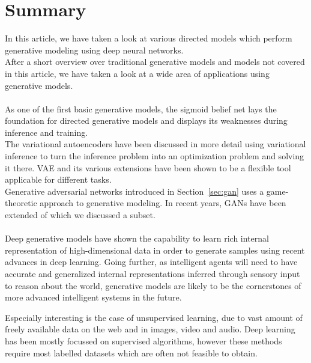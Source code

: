 \section{Summary}
\label{sec:summary}

In this article, we have taken a look at various directed models which perform generative modeling using deep neural networks.\\
After a short overview over traditional generative models and models not covered in this article, we have taken a look at a wide area of applications using generative models.\\\\
%
As one of the first basic generative models, the sigmoid belief net lays the foundation for directed generative models and displays its weaknesses during inference and training.\\
The variational autoencoders have been discussed in more detail using variational inference to turn the inference problem into an optimization problem and solving it there.
VAE and its various extensions have been shown to be a flexible tool applicable for different tasks.\\
%
Generative adversarial networks introduced in Section~\ref{sec:gan} uses a game-theoretic approach to generative modeling. In recent years, GANs have been extended of which we discussed a subset.\\\\
%
Deep generative models have shown the capability to learn rich internal representation of high-dimensional data in order to generate samples using recent advances in deep learning.
Going further, as intelligent agents will need to have accurate and generalized internal representations inferred through sensory input to reason about the world, generative models are likely to be the cornerstones of more advanced intelligent systems in the future.


Especially interesting is the case of unsupervised learning, due to vast amount of freely available data on the web and in images, video and audio. Deep learning has been mostly focussed on supervised algorithms, however these methods require most labelled datasets which are often not feasible to obtain.


